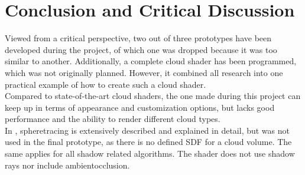 \section{Conclusion and Critical Discussion}
Viewed from a critical perspective, two out of three prototypes have been developed during the project, of which one was dropped because it was too similar to another.
Additionally, a complete cloud shader has been programmed, which was not originally planned. However, it combined all research into one practical example of how to create such a cloud shader.
\\
Compared to state-of-the-art cloud shaders, the one made during this project can keep up in terms of appearance and customization options, but lacks good performance and the ability to render different cloud types.
\\
In , \gls{spheretracing} is extensively described and explained in detail, but was not used in the final prototype, as there is no defined SDF for a cloud volume.
The same applies for all shadow related algorithms. The shader does not use shadow rays nor include \gls{ambientocclusion}.
